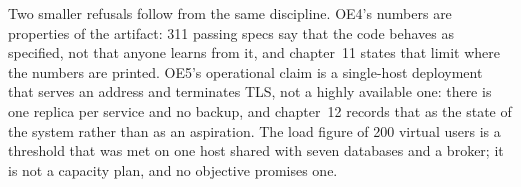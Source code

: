 Two smaller refusals follow from the same discipline. OE4's numbers are properties
of the artifact: 311 passing specs say that the code behaves as specified, not that
anyone learns from it, and chapter~11 states that limit where the numbers are
printed. OE5's operational claim is a single-host deployment that serves an address
and terminates TLS, not a highly available one: there is one replica per service
and no backup, and chapter~12 records that as the state of the system rather than
as an aspiration. The load figure of 200 virtual users is a threshold that was met
on one host shared with seven databases and a broker; it is not a capacity plan,
and no objective promises one.

